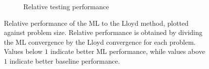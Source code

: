 \documentclass{article}
\begin{document}
\begin{figure}[h!]
\begin{subfigure}[t]{0.47\textwidth}
    \caption{Relative testing performance}
  \end{subfigure}
  \caption{Relative performance of the ML to the Lloyd method, plotted against problem size.  Relative performance is obtained by dividing the ML convergence by the Lloyd convergence for each problem.  Values below $1$ indicate better ML performance, while values above $1$ indicate better baseline performance.}
  \label{fig:aniso_rel_conv}
\end{figure}



\end{document}
